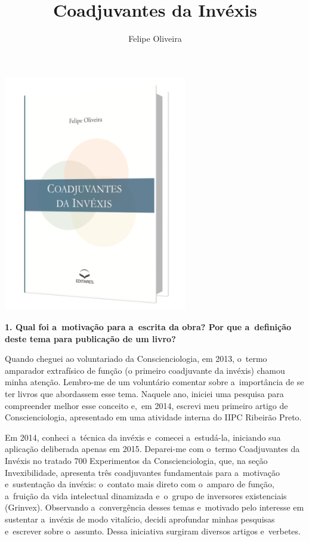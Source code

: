 \documentclass{gescons}
\author{Felipe Oliveira}
\title{Coadjuvantes da Invéxis}
\begin{document}
    \makeentrevistatitle

    \begin{multicols}{2}

\begin{center}
    \includegraphics[width=8cm]{articles/entrevista/mockups/Felipe_Oliveira.png}
\end{center}


\textbf{1. Qual foi a~motivação para a~escrita da obra? Por que a~definição deste tema para publicação de um livro?}

Quando cheguei ao voluntariado da Conscienciologia, em 2013, o~termo amparador extrafísico de função (o primeiro coadjuvante da invéxis) chamou minha atenção. Lembro-me de um voluntário comentar sobre a~importância de se ter livros que abordassem esse tema. Naquele ano, iniciei uma pesquisa para compreender melhor esse conceito e,~em 2014, escrevi meu primeiro artigo de Conscienciologia, apresentado em uma atividade interna do IIPC Ribeirão Preto.

Em 2014, conheci a~técnica da invéxis e~comecei a~estudá-la, iniciando sua aplicação deliberada apenas em 2015. Deparei-me com o~termo Coadjuvantes da Invéxis no tratado 700 Experimentos da Conscienciologia, que, na seção Invexibilidade, apresenta três coadjuvantes fundamentais para a~motivação e~sustentação da invéxis: o~contato mais direto com o~amparo de função, a~fruição da vida intelectual dinamizada e~o~grupo de inversores existenciais (Grinvex). Observando a~convergência desses temas e~motivado pelo interesse em sustentar a~invéxis de modo vitalício, decidi aprofundar minhas pesquisas e~escrever sobre o~assunto. Dessa iniciativa surgiram diversos artigos e~verbetes.


\end{multicols}
\end{document}
